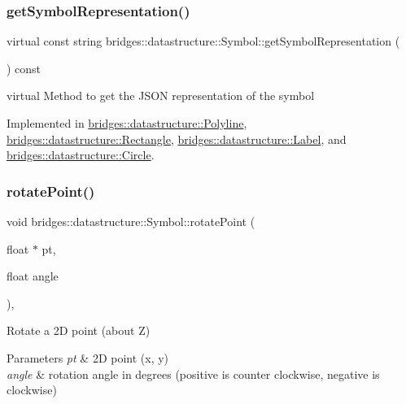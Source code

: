 \subsubsection{\texorpdfstring{get\+Symbol\+Representation()}{getSymbolRepresentation()}}
{\footnotesize\ttfamily virtual const string bridges\+::datastructure\+::\+Symbol\+::get\+Symbol\+Representation (\begin{DoxyParamCaption}{ }\end{DoxyParamCaption}) const\hspace{0.3cm}{\ttfamily [pure virtual]}}

virtual Method to get the J\+S\+ON representation of the symbol 

Implemented in \hyperlink{classbridges_1_1datastructure_1_1_polyline_a176c06400a3b105fa651c69891381201}{bridges\+::datastructure\+::\+Polyline}, \hyperlink{classbridges_1_1datastructure_1_1_rectangle_ada89ed40d2515a3518084f5460ba8dac}{bridges\+::datastructure\+::\+Rectangle}, \hyperlink{classbridges_1_1datastructure_1_1_label_aa3b7c9e5630ecc8a2534e6db2a220e90}{bridges\+::datastructure\+::\+Label}, and \hyperlink{classbridges_1_1datastructure_1_1_circle_a796c88ccb8c5529d45aa7271a34fa3fe}{bridges\+::datastructure\+::\+Circle}.

\mbox{\label{classbridges_1_1datastructure_1_1_symbol_ad40678e04bae69b4c03881148678e71e}} 
\subsubsection{\texorpdfstring{rotate\+Point()}{rotatePoint()}}
{\footnotesize\ttfamily void bridges\+::datastructure\+::\+Symbol\+::rotate\+Point (\begin{DoxyParamCaption}\item[{float $\ast$}]{pt,  }\item[{float}]{angle }\end{DoxyParamCaption})\hspace{0.3cm}{\ttfamily [inline]}, {\ttfamily [protected]}}



Rotate a 2D point (about Z) 


\begin{DoxyParams}{Parameters}
{\em pt} & 2D point (x, y) \\
\hline
{\em angle} & rotation angle in degrees (positive is counter clockwise, negative is clockwise) \\
\hline
\end{DoxyParams}
\mbox{\label{classbridges_1_1datastructure_1_1_symbol_ac27131f6461a763e55f1127f3cf87932}} 
